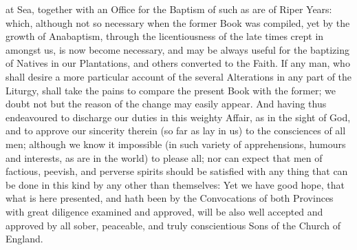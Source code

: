 at Sea, together with an Office for the Baptism of such as are of Riper Years: which, although not so necessary when the former Book was compiled, yet by the growth of Anabaptism, through the licentiousness of the late times crept in amongst us, is now become necessary, and may be always useful for the baptizing of Natives in our Plantations, and others converted to the Faith. If any man, who shall desire a more particular account of the several Alterations in any part of the Liturgy, shall take the pains to compare the present Book with the former; we doubt not but the reason of the change may easily appear. And having thus endeavoured to discharge our duties in this weighty Affair, as in the sight of God, and to approve our sincerity therein (so far as lay in us) to the consciences of all men; although we know it impossible (in such variety of apprehensions, humours and interests, as are in the world) to please all; nor can expect that men of factious, peevish, and perverse spirits should be satisfied with any thing that can be done in this kind by any other than themselves: Yet we have good hope, that what is here presented, and hath been by the Convocations of both Provinces with great diligence examined and approved, will be also well accepted and approved by all sober, peaceable, and truly conscientious Sons of the Church of England.


